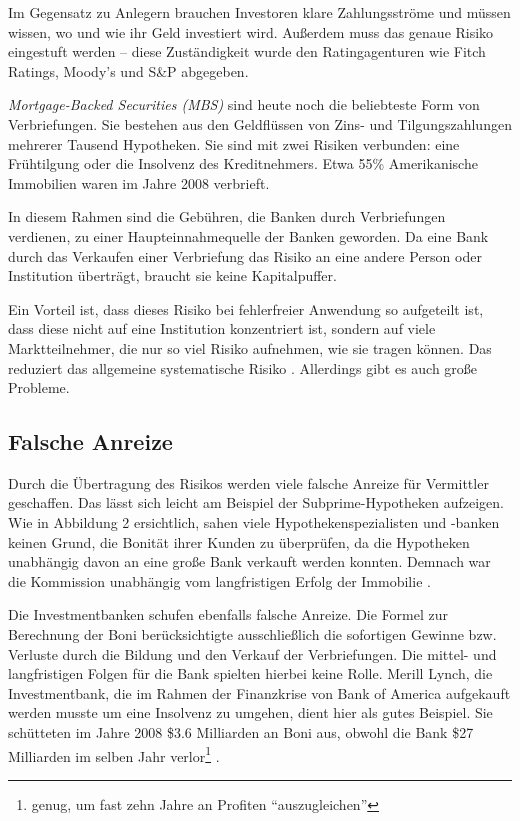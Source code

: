 \documentclass[a4paper,11pt]{report}
\begin{document}
Im Gegensatz zu Anlegern brauchen Investoren klare
Zahlungsstr\"ome und m\"ussen wissen, wo und wie 
ihr Geld investiert wird. Außerdem muss
das genaue Risiko eingestuft werden -- diese Zust\"andigkeit
wurde den Ratingagenturen wie Fitch Ratings, Moody's und S\&P
abgegeben.

\textit{Mortgage-Backed Securities (MBS)} sind 
heute noch die beliebteste Form von Verbriefungen.
Sie bestehen aus den Geldfl\"ussen
von Zins- und Tilgungszahlungen
mehrerer Tausend Hypotheken. Sie sind mit zwei
Risiken verbunden: eine Fr\"uhtilgung
oder die Insolvenz des Kreditnehmers.
Etwa 55\% Amerikanische Immobilien waren im Jahre
2008 verbrieft.

In diesem Rahmen sind die Geb\"uhren, die Banken
durch Verbriefungen verdienen, zu einer
Haupteinnahmequelle der Banken geworden. Da eine
Bank durch das Verkaufen einer Verbriefung
das Risiko an eine andere Person oder Institution
\"ubertr\"agt, braucht sie keine Kapitalpuffer.

Ein Vorteil ist, dass dieses Risiko bei fehlerfreier Anwendung
so aufgeteilt ist, dass diese nicht auf eine Institution
konzentriert ist, sondern auf viele Marktteilnehmer,
die nur so viel Risiko aufnehmen, wie sie tragen k\"onnen.
Das reduziert das allgemeine systematische Risiko \parencite[198--201]{acharyar}.
Allerdings gibt es auch große Probleme.

\subsection{Falsche Anreize}
Durch die \"Ubertragung des Risikos werden
viele falsche Anreize f\"ur Vermittler geschaffen. 
Das l\"asst sich leicht am Beispiel der Subprime-Hypotheken aufzeigen.
Wie in Abbildung 2 ersichtlich, sahen viele
Hypothekenspezialisten und -banken keinen Grund, die 
Bonit\"at ihrer Kunden zu \"uberpr\"ufen, da die Hypotheken
unabh\"angig davon an eine große Bank verkauft werden konnten.
Demnach war die Kommission unabh\"angig vom langfristigen Erfolg
der Immobilie \parencite[565]{crottycam}.

Die Investmentbanken schufen ebenfalls falsche Anreize.
Die Formel zur Berechnung der Boni ber\"ucksichtigte ausschließlich
die sofortigen Gewinne bzw. Verluste durch die Bildung und den Verkauf
der Verbriefungen.
Die mittel- und langfristigen Folgen f\"ur die Bank
spielten hierbei keine Rolle.
Merill Lynch, die Investmentbank, die im Rahmen der Finanzkrise von
Bank of America aufgekauft werden musste um eine Insolvenz zu umgehen,
dient hier als gutes Beispiel. Sie sch\"utteten im Jahre 2008 \$3.6
Milliarden an Boni aus,
obwohl die Bank \$27 Milliarden im selben Jahr verlor\footnote{genug, um fast zehn Jahre an Profiten \enquote{auszugleichen}} \parencite[565]{crottycam}.
\end{document}
